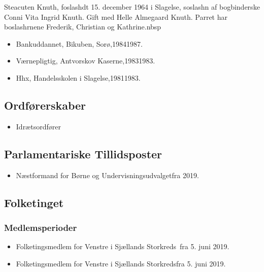 \documentclass[11pt, a4paper]{awesome-cv}
\begin{document}
\makecvheader[R]
\makelettertitle
\begin{cvletter}
Steacuten Knuth, foslashdt 15. december 1964 i Slagelse, soslashn af bogbinderske Conni Vita Ingrid Knuth. Gift med Helle Almegaard Knuth. Parret har boslashrnene Frederik, Christian og Kathrine.nbsp

\begin{itemize}
\item Bankuddannet, Bikuben, Sorø,19841987.
\item Værnepligtig, Antvorskov Kaserne,19831983.
\item Hhx, Handelsskolen i Slagelse,19811983.
\end{itemize}
\subsection*{Ordførerskaber}
\begin{itemize}
\item Idrætsordfører
\end{itemize}
\subsection*{Parlamentariske Tillidsposter}
\begin{itemize}
\item Næstformand for Børne og Undervisningsudvalgetfra 2019.
\end{itemize}
\subsection*{Folketinget}
\subsubsection*{Medlemsperioder}
\begin{itemize}
\item Folketingsmedlem for Venstre i Sjællands Storkreds fra 5. juni 2019.
\item Folketingsmedlem for Venstre i Sjællands Storkredsfra 5. juni 2019.
\end{itemize}

\end{cvletter}
\end{document}
